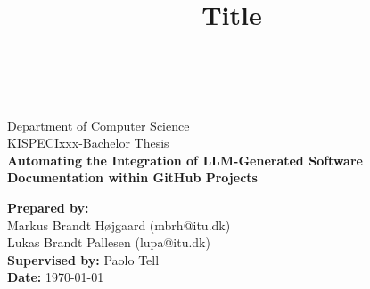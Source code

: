 \documentclass[12pt]{article}
\title{Title}
\makeatletter
\def \LOGOPATH {Figures/ITU.svg}
\def \DEPARTEMENT {Department of Computer Science}
\def \COURSENUM {KISPECIxxx}
\def \COURSENAME {Bachelor Thesis}
\def \REPORTTITLE {Automating the Integration of LLM-Generated Software Documentation within GitHub Projects}
\def \STUDENTNAMEI {Markus Brandt Højgaard (mbrh@itu.dk)}
\def \STUDENTNAMEII {Lukas Brandt Pallesen (lupa@itu.dk)}
\def \INSTRUCTOR {Paolo Tell}
\makeatother
\begin{document}

\begin{titlepage}
    \vfill
    \begin{center}
         \\
        \hfill \\
        \Large{\DEPARTEMENT} \\
        \Large{\COURSENUM\;-\;\COURSENAME} \\
        \vfill
        \textbf{\LARGE{\REPORTTITLE}}
    \end{center}
    \vfill
    \begin{flushleft}
        \Large{\textbf{Prepared by:}} \\
        \Large{\STUDENTNAMEI} \\
        \Large{\STUDENTNAMEII} \\
        \Large{\textbf{Supervised by:} \INSTRUCTOR} \\
        \Large{\textbf{Date:} \today}
    \end{flushleft}
    \vfill
\end{titlepage}







\newpage

\tableofcontents

\newpage














\label{EndOfText}

\newpage
{}


\label{endOfDoc}






\end{document}
